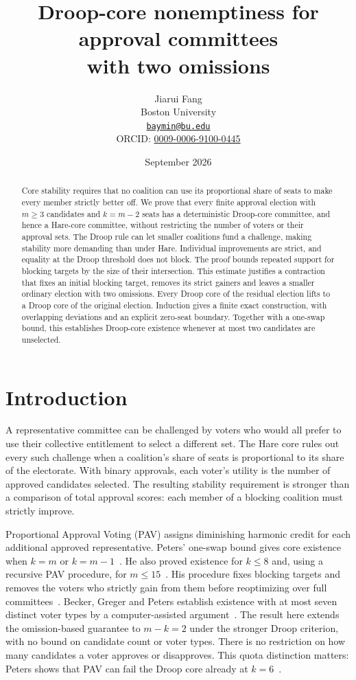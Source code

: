 \documentclass[11pt]{article}
\title{Droop-core nonemptiness for approval committees\\with two omissions}
\author{Jiarui Fang\\[0.35em]
\small Boston University\\
\small \href{mailto:baymin@bu.edu}{\texttt{baymin@bu.edu}}\\
\small ORCID: \href{https://orcid.org/0009-0006-9100-0445}{0009-0006-9100-0445}}
\date{September 2026}
\begin{document}
\maketitle
\begin{abstract}
Core stability requires that no coalition can use its proportional share
of seats to make every member strictly better off. We prove that every
finite approval election with $m\ge3$ candidates and $k=m-2$ seats has a
deterministic Droop-core committee, and hence a Hare-core committee,
without restricting the number of voters or their approval sets.
The Droop rule can let smaller coalitions fund a challenge, making
stability more demanding than under Hare.
Individual improvements are strict, and equality at the Droop threshold
does not block. The proof bounds repeated
support for blocking targets by the size of their intersection. This
estimate justifies a contraction that fixes an initial blocking target,
removes its strict gainers and leaves a smaller ordinary election with
two omissions. Every Droop core of the residual election lifts to a
Droop core of the original election. Induction gives a finite exact
construction, with overlapping deviations and an explicit zero-seat
boundary. Together with a one-swap bound, this establishes Droop-core
existence whenever at most two candidates are unselected.
\end{abstract}

\section{Introduction}
A representative committee can be challenged by voters who would all
prefer to use their collective entitlement to select a different set.
The Hare core rules out every such challenge when a coalition's share
of seats is proportional to its share of the electorate. With binary
approvals, each voter's utility is the number of approved candidates
selected. The resulting stability requirement is stronger than a
comparison of total approval scores: each member of a blocking
coalition must strictly improve.

Proportional Approval Voting (PAV) assigns diminishing harmonic credit
for each additional approved representative. Peters' one-swap bound gives
core existence when $k=m$ or $k=m-1$~\cite[Lemma~3.1(ii)]{Peters2025}.
He also proved existence for $k\le8$ and, using a recursive PAV
procedure, for $m\le15$~\cite[Theorems 4.1, 4.5 and 5.3]{Peters2025}.
His procedure fixes blocking targets and removes the voters who strictly
gain from them before
reoptimizing over full committees~\cite[Algorithm 1]{Peters2025}.
Becker, Greger and Peters establish existence with at most seven distinct
voter types by a computer-assisted argument~\cite[Theorems 2.5 and 5.2]{BGP2026}.
The result here extends the omission-based guarantee to $m-k=2$ under
the stronger Droop criterion, with no bound on candidate count or voter types.
There is no restriction on how many candidates a voter approves or
disapproves. This quota distinction matters: Peters shows that PAV can
fail the Droop core already at $k=6$~\cite[Example~6.1]{Peters2025}.
\end{document}
